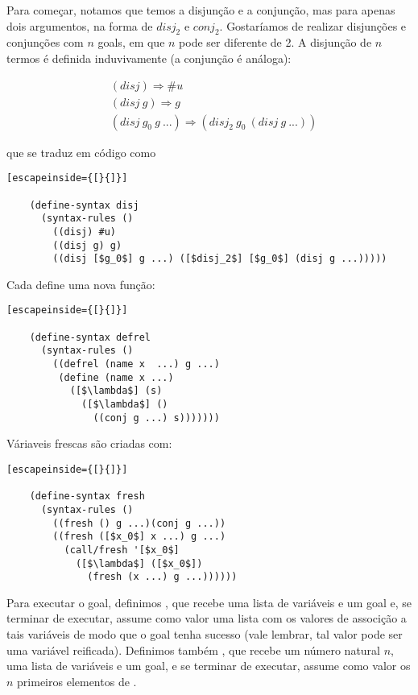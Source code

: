 \documentclass{article}
\begin{document}
  Para começar, notamos que temos a disjunção e a conjunção, mas para
  apenas dois argumentos, na forma de  $disj_2$ e $conj_2$. Gostaríamos
  de realizar disjunções e conjunções com $n$ goals, em que $n$ pode
  ser diferente de 2. A disjunção de $n$ termos é definida
  induvivamente (a conjunção é análoga):

  \begin{align*}
    &(disj) \Rightarrow \#u \\
    &(disj\ g) \Rightarrow g \\
    &(disj\ g_0\ g\ ...) \Rightarrow (disj_2\ g_0\ (disj\ g\ ...))
  \end{align*}

  \noindent que se traduz em código como

  \begin{lstlisting}[escapeinside={[}{]}]

    (define-syntax disj
      (syntax-rules ()
        ((disj) #u)
        ((disj g) g)
        ((disj [$g_0$] g ...) ([$disj_2$] [$g_0$] (disj g ...)))))

  \end{lstlisting}

  Cada  define uma nova função:

  \begin{lstlisting}[escapeinside={[}{]}]

    (define-syntax defrel
      (syntax-rules ()
        ((defrel (name x  ...) g ...)
         (define (name x ...)
           ([$\lambda$] (s)
             ([$\lambda$] ()
               ((conj g ...) s)))))))

  \end{lstlisting}
             
  Váriaveis frescas são criadas com:

  \begin{lstlisting}[escapeinside={[}{]}]

    (define-syntax fresh
      (syntax-rules ()
        ((fresh () g ...)(conj g ...))
        ((fresh ([$x_0$] x ...) g ...)
          (call/fresh '[$x_0$]
            ([$\lambda$] ([$x_0$])
              (fresh (x ...) g ...))))))

  \end{lstlisting}
  
  Para executar o goal, definimos , que recebe uma
  lista de variáveis e um goal e, se terminar de executar, assume como
  valor uma lista com os valores de associção a tais variáveis de modo
  que o goal tenha sucesso (vale lembrar, tal valor pode ser uma
  variável reificada). Definimos também , que recebe
  um número natural $n$, uma lista de variáveis e um goal, e se
  terminar de executar, assume como valor os $n$ primeiros elementos
  de .
\end{document}
